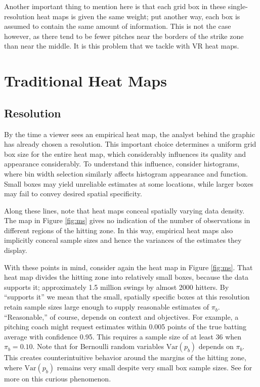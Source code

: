 Another important thing to mention here is that each grid box in these single-resolution heat maps is given the same weight; put another way, each box is assumed to contain the same amount of information. This is not the case however, as there tend to be fewer pitches near the borders of the strike zone than near the middle. It is this problem that we tackle with VR heat maps.

\section{Traditional Heat Maps} \label{THM}

\subsection{Resolution} %

By the time a viewer sees an empirical heat map, the analyst behind the graphic has already chosen a resolution. This important choice determines a uniform grid box size for the entire heat map, which considerably influences its quality and appearance considerably. To understand this influence, consider histograms, where bin width selection similarly affects histogram appearance and function. Small boxes may yield unreliable estimates at some locations, while larger boxes may fail to convey desired spatial specificity. 

Along these lines, note that heat maps conceal spatially varying data density. The map in Figure \ref{fig:ms} gives no indication of the number of observations in different regions of the hitting zone. In this way, empirical heat maps also implicitly conceal sample sizes and hence the variances of the estimates they display.  

With these points in mind, consider again the heat map in Figure \ref{fig:ms}. That heat map divides the hitting zone into relatively small boxes, because the data supports it; approximately 1.5 million swings by almost 2000 hitters. By ``supports it'' we mean that the small, spatially specific boxes at this resolution retain sample sizes large enough to supply reasonable estimates of $\pi_{b}$. ``Reasonable,'' of course, depends on context and objectives. For example, a pitching coach might request estimates within 0.005 points of the true batting average with confidence 0.95. This requires a sample size of at least 36 when $\pi_{b} = 0.10$. Note that for Bernoulli random variables $\text{Var}(p_{b})$ depends on $\pi_{b}$. This creates counterintuitive behavior around the margins of the hitting zone, where $\text{Var}(p_{b})$ remains very small despite very small box sample sizes. See \cite{Dixon2005} for more on this curious phenomenon.


